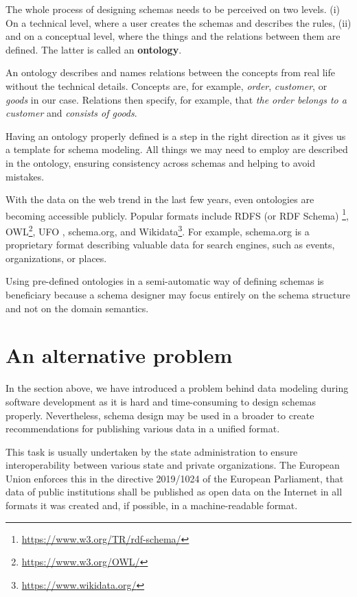 The whole process of designing schemas needs to be perceived on two levels. (i) On a technical level, where a user creates the schemas and describes the rules, (ii) and on a conceptual level, where the things and the relations between them are defined. The latter is called an \textbf{ontology}.

An ontology describes and names relations between the concepts from real life without the technical details. Concepts are, for example, \textit{order}, \textit{customer}, or \textit{goods} in our case. Relations then specify, for example, that \textit{the order belongs to a customer} and \textit{consists of goods}.

Having an ontology properly defined is a step in the right direction as it gives us a template for schema modeling. All things we may need to employ are described in the ontology, ensuring consistency across schemas and helping to avoid mistakes.

\medskip

With the data on the web \cite{data-on-the-web} trend in the last few years, even ontologies are becoming accessible publicly. Popular formats include RDFS (or RDF Schema) \footnote{\url{https://www.w3.org/TR/rdf-schema/}}, OWL\footnote{\url{https://www.w3.org/OWL/}}, UFO \cite{ufo22}, schema.org, and Wikidata\footnote{\url{https://www.wikidata.org/}}. For example, schema.org is a proprietary format describing valuable data for search engines, such as events, organizations, or places.

Using pre-defined ontologies in a semi-automatic way of defining schemas is beneficiary because a schema designer may focus entirely on the schema structure and not on the domain semantics.

\section*{An alternative problem}

In the section above, we have introduced a problem behind data modeling during software development as it is hard and time-consuming to design schemas properly. Nevertheless, schema design may be used in a broader to create recommendations for publishing various data in a unified format.

This task is usually undertaken by the state administration to ensure interoperability between various state and private organizations. The European Union enforces this in the directive 2019/1024 of the European Parliament, that data of public institutions shall be published as open data on the Internet in all formats it was created and, if possible, in a machine-readable format.


